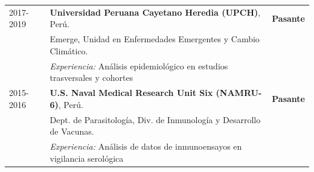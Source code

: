 \documentclass[margin,line]{res}
\begin{document}
\begin{resume}
		\begin{tabular}{ l l l }
			2017-2019 & \textbf{Universidad Peruana Cayetano Heredia (UPCH)}, Perú.& {\bf Pasante}\\
			& Emerge, Unidad en Enfermedades Emergentes y Cambio Climático.&\\
			&\textit{Experiencia:} Análisis epidemiológico en estudios trasversales y cohortes&\\
			2015-2016 & \textbf{U.S. Naval Medical Research Unit Six (NAMRU-6)}, Perú.&{\bf Pasante}\\
			& Dept. de Parasitología, Div. de Inmunología y Desarrollo de Vacunas.&\\
			&\textit{Experiencia:} Análisis de datos de inmunoensayos en vigilancia serológica&\\
		\end{tabular}
		
		

\end{resume}
\end{document}
